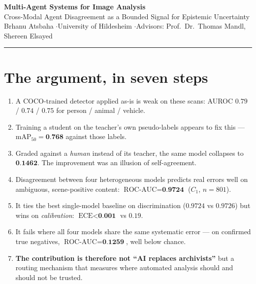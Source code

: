 \documentclass[10pt,a4paper]{article}
\newcommand{\num}[1]{\textbf{#1}}
\begin{document}
\begin{center}
{\Large\bfseries Multi-Agent Systems for Image Analysis}\\[1mm]
{\normalsize Cross-Modal Agent Disagreement as a Bounded Signal for Epistemic Uncertainty}\\[2mm]
{\footnotesize\color{PrismGray} Brhanu Atsbaha \quad$\cdot$\quad University of Hildesheim \quad$\cdot$\quad Advisors: Prof.\ Dr.\ Thomas Mandl, Shereen Elsayed}
\end{center}
\vspace{-2mm}
\rule{\textwidth}{0.8pt}

\section{The argument, in seven steps}
\begin{enumerate}[leftmargin=1.4em, itemsep=2pt, topsep=3pt]
  \item A COCO-trained detector applied as-is is weak on these scans: AUROC $0.79$ / $0.74$ / $0.75$ for person / animal / vehicle.
  \item Training a student on the teacher's own pseudo-labels appears to fix this --- $\text{mAP}_{50}=\num{0.768}$ against those labels.
  \item Graded against a \emph{human} instead of its teacher, the same model collapses to $\num{0.1462}$. The improvement was an illusion of self-agreement.
  \item Disagreement between four heterogeneous models predicts real errors well on ambiguous, scene-positive content: $\text{ROC-AUC}=\num{0.9724}$ ($C_1$, $n=801$).
  \item It ties the best single-model baseline on discrimination ($0.9724$ vs $0.9726$) but wins on \emph{calibration}: $\text{ECE}<\num{0.001}$ vs $0.19$.
  \item It fails where all four models share the same systematic error --- on confirmed true negatives, $\text{ROC-AUC}=\num{0.1259}$, well below chance.
  \item \textbf{The contribution is therefore not ``AI replaces archivists''} but a routing mechanism that measures where automated analysis should and should not be trusted.
\end{enumerate}
\end{document}
